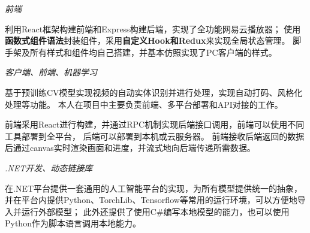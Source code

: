 \documentclass{uniquecv}
\begin{document}
\textit{前端}
\vspace{0.4ex}
 
利用React框架构建前端和Express构建后端，实现了全功能网易云播放器；
使用\textbf{函数式组件语法}封装组件，采用\textbf{自定义Hook和Redux}来实现全局状态管理。
脚手架及所有样式和组件均自己搭建，并基本仿照实现了PC客户端的样式。

\textit{客户端、前端、机器学习}
\vspace{0.4ex}

基于预训练CV模型实现视频的自动实体识别并进行处理，实现自动打码、风格化处理等功能。
本人在项目中主要负责前端、多平台部署和API对接的工作。
\par 前端采用React进行构建，并通过RPC机制实现后端接口调用，前端可以使用不同工具部署到全平台，
后端可以部署到本机或云服务器。
前端接收后端返回的数据后通过canvas实时渲染画面和进度，并流式地向后端传递所需数据。



\textit{.NET开发、动态链接库}
\vspace{0.4ex}

在.NET平台提供一套通用的人工智能平台的实现，为所有模型提供统一的抽象，
并在平台内提供Python、TorchLib、Tensorflow等常用的运行环境，可以方便地导入并运行外部模型；
此外还提供了使用C\#编写本地模型的能力，也可以使用Python作为脚本语言调用本地能力。






\end{document}
